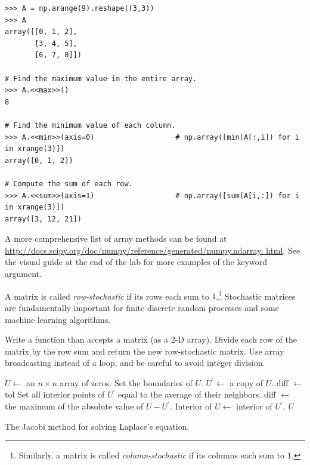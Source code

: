 \begin{lstlisting}
>>> A = np.arange(9).reshape((3,3))
>>> A
array([[0, 1, 2],
       [3, 4, 5],
       [6, 7, 8]])
       
# Find the maximum value in the entire array.
>>> A.<<max>>() 
8

# Find the minimum value of each column.
>>> A.<<min>>(axis=0)                   # np.array([min(A[:,i]) for i in xrange(3)])
array([0, 1, 2])

# Compute the sum of each row.
>>> A.<<sum>>(axis=1)                   # np.array([sum(A[i,:]) for i in xrange(3)])
array([3, 12, 21])
\end{lstlisting}

A more comprehensive list of array methods can be found at
\url{http://docs.scipy.org/doc/numpy/reference/generated/numpy.ndarray.
html}.
See the visual guide at the end of the lab for more examples of the  keyword argument.

\begin{problem} %
A matrix is called \emph{row-stochastic} if its rows each sum to $1$.\footnote{Similarly, a matrix is called \emph{column-stochastic} if its columns each sum to $1$.}
Stochastic matrices are fundamentally important for finite discrete random processes and some machine learning algorithms.

Write a function than accepts a matrix (as a 2-D array).
Divide each row of the matrix by the row sum and return the new row-stochastic matrix.
Use array broadcasting instead of a loop, and be careful to avoid integer division.
\end{problem}

\begin{algorithm} %
\begin{algorithmic}[1]
\State $U \gets$ an $n\times n$ array of zeros.
\State Set the boundaries of $U$.
\State $U^\prime \gets$ a copy of $U$.
\State diff $\gets$ tol
    \State Set all interior points of $U^\prime$ equal to the average of their neighbors.
    \State diff $\gets$ the maximum of the absolute value of $U - U^\prime$.
    \State Interior of $U \gets$ interior of $U^\prime $.
\EndWhile
\State {} $U$
\EndProcedure
\end{algorithmic}
\caption{The Jacobi method for solving Laplace's equation.}
\label{alg:jacobi}
\end{algorithm}

